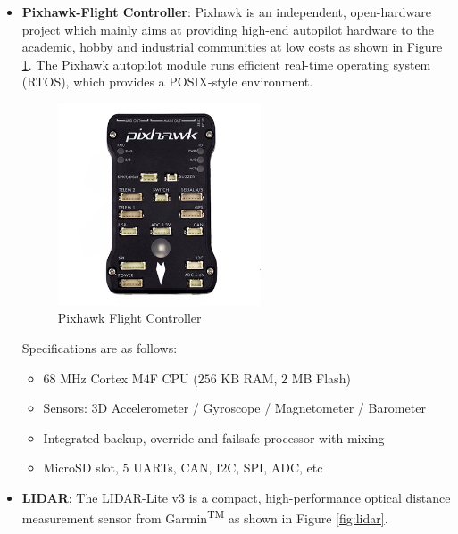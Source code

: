 \documentclass[12pt]{report}
\begin{document}
\begin{itemize}
\item \textbf{Pixhawk-Flight Controller}: Pixhawk is an independent, open-hardware project which mainly aims at providing high-end autopilot hardware to the academic, hobby and industrial communities at low costs as shown in Figure \ref{fig:pixhawk}. The Pixhawk autopilot module runs efficient real-time operating system (RTOS), which provides a POSIX-style environment.
\begin{figure}[H]
	\centering 
    \includegraphics[width=6cm]{pixhawk.jpg}
	\caption{Pixhawk Flight Controller}
   \label{fig:pixhawk}
\end{figure}

Specifications are as follows:
\begin {itemize}
\item $68$ MHz Cortex M$4$F CPU ($256$ KB RAM, $2$ MB Flash)
\item Sensors: $3$D Accelerometer / Gyroscope / Magnetometer / Barometer
\item Integrated backup, override and failsafe processor with mixing
\item MicroSD slot, $5$ UARTs, CAN, I$2$C, SPI, ADC, etc
\end{itemize}

\item \textbf{LIDAR}: The LIDAR-Lite v$3$ is a compact, high-performance optical distance measurement sensor from Garmin\textsuperscript{TM} as shown in Figure \ref{fig:lidar}.


\end{itemize}
\end{document}

